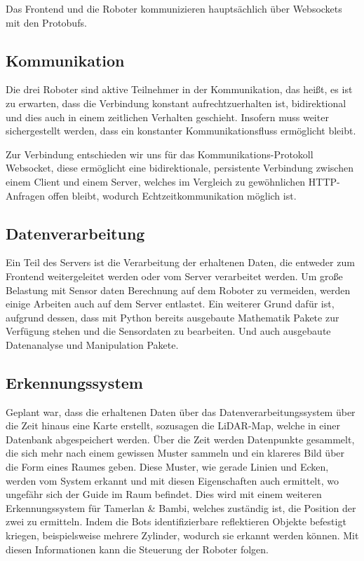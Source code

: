Das Frontend und die Roboter kommunizieren hauptsächlich 
über Websockets mit den Protobufs.

\subsection{Kommunikation}
\label{subsec:Kommunikation}
Die drei Roboter sind aktive Teilnehmer in der Kommunikation, 
das heißt, es ist zu erwarten, dass die Verbindung konstant aufrechtzuerhalten ist, 
bidirektional und dies auch in einem zeitlichen Verhalten geschieht. 
Insofern muss weiter sichergestellt werden, 
dass ein konstanter Kommunikationsfluss ermöglicht bleibt.

Zur Verbindung entschieden wir uns für das Kommunikations-Protokoll Websocket, 
diese ermöglicht eine bidirektionale, 
persistente Verbindung zwischen einem Client und einem Server,
welches im Vergleich zu gewöhnlichen HTTP-Anfragen offen bleibt, 
wodurch Echtzeitkommunikation möglich ist.

\subsection{Datenverarbeitung}
Ein Teil des Servers ist die Verarbeitung der erhaltenen Daten, 
die entweder zum Frontend weitergeleitet werden oder vom Server verarbeitet werden.
% 
Um große Belastung mit Sensor daten Berechnung auf dem Roboter zu vermeiden, 
werden einige Arbeiten auch auf dem Server entlastet.
Ein weiterer Grund dafür ist, aufgrund dessen, 
dass mit Python bereits ausgebaute Mathematik Pakete zur Verfügung stehen 
und die Sensordaten zu bearbeiten.
Und auch ausgebaute Datenanalyse und Manipulation Pakete.


\subsection{Erkennungssystem}
Geplant war, dass die erhaltenen Daten über das Datenverarbeitungssystem 
über die Zeit hinaus eine Karte erstellt, sozusagen die LiDAR-Map, 
welche in einer Datenbank abgespeichert werden.
% 
Über die Zeit werden Datenpunkte gesammelt, 
die sich mehr nach einem gewissen Muster sammeln 
und ein klareres Bild über die Form eines Raumes geben.
Diese Muster, wie gerade Linien und Ecken, werden vom System erkannt 
und mit diesen Eigenschaften auch ermittelt, 
wo ungefähr sich der Guide im Raum befindet.
% 
Dies wird mit einem weiteren Erkennungssystem für Tamerlan \& Bambi, 
welches zuständig ist, die Position der zwei zu ermitteln.
Indem die Bots identifizierbare reflektieren Objekte befestigt kriegen, 
beispielsweise mehrere Zylinder, wodurch sie erkannt werden können.
%
Mit diesen Informationen kann die Steuerung der Roboter folgen.


